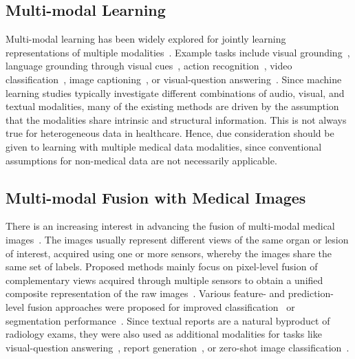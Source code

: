 \documentclass[pmlr]{jmlr}
\begin{document}
\subsection{Multi-modal Learning}
Multi-modal learning has been widely explored for jointly learning representations of multiple modalities~\citep{baltruvsaitis2018multimodal}. Example tasks include visual grounding~\citep{chen2021endtoend}, language grounding through visual cues~\citep{zhang2021explainable}, action recognition~\citep{chen2015utd}, video classification~\citep{nagrani2021attention}, image captioning~\citep{yu2019multimodal}, or visual-question answering~\citep{zellers2021merlot}. Since machine learning studies typically investigate different combinations of audio, visual, and textual modalities, many of the existing methods are driven by the assumption that the modalities share intrinsic and structural information. This is not always true for heterogeneous data in healthcare. Hence, due consideration should be given to learning with multiple medical data modalities, since conventional assumptions for non-medical data are not necessarily applicable.



\subsection{Multi-modal Fusion with Medical Images}
There is an increasing interest in advancing the fusion of multi-modal medical images~\citep{imaging_fusion}. The images usually represent different views of the same organ or lesion of interest, acquired using one or more sensors, whereby the images share the same set of labels. Proposed methods mainly focus on pixel-level fusion of complementary views acquired through multiple sensors to obtain a unified composite representation of the raw images~\citep{img_fusion, JAMES20144}. Various feature- and prediction-level fusion approaches were proposed for improved classification~\citep{Therapy_Response, Breast_Cancer, cancersubtypes} or segmentation performance~\citep{imaging_fusion}. Since textual reports are a natural byproduct of radiology exams, they were also used as additional modalities for tasks like visual-question answering~\citep{imag_reports, Sharma2021}, report generation~\citep{radiology}, or zero-shot image classification~\citep{gzsl, MVSE}. 
 
\end{document}
